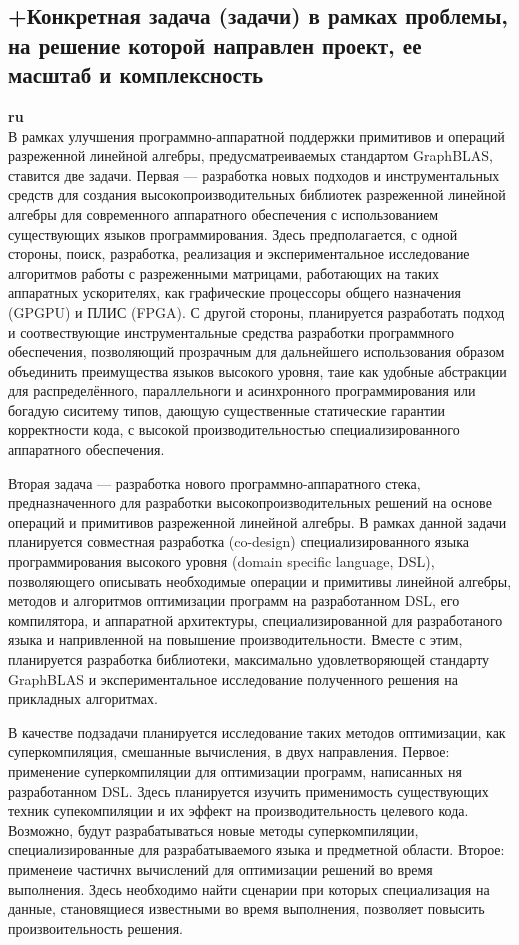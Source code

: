 \documentclass[12pt]{article}  %
\theoremstyle{remark}
\begin{document}
\subsection{+Конкретная задача (задачи) в рамках проблемы, на решение которой направлен проект, ее масштаб и комплексность}

\textbf{ru}\\
%
В рамках улучшения программно-аппаратной поддержки примитивов и операций разреженной линейной алгебры, предусматреиваемых стандартом GraphBLAS, ставится две задачи. Первая --- разработка новых подходов и инструментальных средств для создания высокопроизводительных библиотек разреженной линейной алгебры для современного аппаратного обеспечения с использованием существующих языков программирования. Здесь предполагается, с одной стороны, поиск, разработка, реализация и экспериментальное исследование алгоритмов работы с разреженными матрицами, работающих на таких аппаратных ускорителях, как графические процессоры общего назначения (GPGPU) и ПЛИС (FPGA). С другой стороны, планируется разработать подход и соотвествующие инструментальные средства разработки программного обеспечения, позволяющий прозрачным для дальнейшего использования образом объединить преимущества языков высокого уровня, таие как удобные абстракции для распределённого, параллельноги и асинхронного программирования или богадую сиситему типов, дающую существенные статические гарантии корректности кода, с высокой производительностью специализированного аппаратного обеспечения.  

Вторая задача --- разработка нового программно-аппаратного стека, предназначенного для разработки высокопроизводительных решений на основе операций и примитивов разреженной линейной алгебры. В рамках данной задачи планируется совместная разработка (co-design) специализированного языка программирования высокого уровня (domain specific language, DSL), позволяющего описывать необходимые операции и примитивы линейной алгебры, методов и алгоритмов оптимизации программ на разработанном DSL, его компилятора, и аппаратной архитектуры, специализированной для разработаного языка и напривленной на повышение производительности. Вместе с этим, планируется разработка библиотеки, максимально удовлетворяющей стандарту GraphBLAS и экспериментальное исследование полученного решения на прикладных алгоритмах.

В качестве подзадачи планируется исследование таких методов оптимизации, как суперкомпиляция, смешанные вычисления, в двух направления. Первое: применение суперкомпиляции для оптимизации программ, написанных ня разработанном DSL. Здесь планируется изучить применимость существующих техник супекомпиляции и их эффект на производительность целевого кода. Возможно, будут разрабатываться новые методы суперкомпиляции, специализированные для разрабатываемого языка и предметной области. Второе: применеие частичнх вычислений для оптимизации решений во время выполнения. Здесь необходимо найти сценарии при которых специализация на данные, становящиеся известными во время выполнения, позволяет повысить произвоительность решения.
\end{document}
